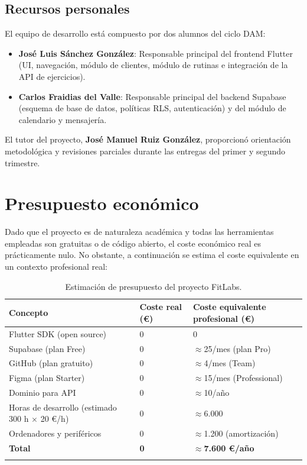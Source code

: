 \subsection{Recursos personales}

El equipo de desarrollo está compuesto por dos alumnos del ciclo DAM:

\begin{itemize}
  \item \textbf{José Luis Sánchez González}: Responsable principal del frontend Flutter (UI, navegación, módulo de clientes, módulo de rutinas e integración de la API de ejercicios).
  \item \textbf{Carlos Fraidias del Valle}: Responsable principal del backend Supabase (esquema de base de datos, políticas RLS, autenticación) y del módulo de calendario y mensajería.
\end{itemize}

El tutor del proyecto, \textbf{José Manuel Ruiz González}, proporcionó orientación metodológica y revisiones parciales durante las entregas del primer y segundo trimestre.

\section{Presupuesto económico}

Dado que el proyecto es de naturaleza académica y todas las herramientas empleadas son gratuitas o de código abierto, el coste económico real es prácticamente nulo. No obstante, a continuación se estima el coste equivalente en un contexto profesional real:

\begin{longtable}{@{}p{6.5cm}p{3cm}p{4cm}@{}}
\toprule
\textbf{Concepto} & \textbf{Coste real (€)} & \textbf{Coste equivalente profesional (€)} \\
\midrule
\endhead
Flutter SDK (open source) & 0 & 0 \\
Supabase (plan Free) & 0 & $\approx$25/mes (plan Pro) \\
GitHub (plan gratuito) & 0 & $\approx$4/mes (Team) \\
Figma (plan Starter) & 0 & $\approx$15/mes (Professional) \\
Dominio para API & 0 & $\approx$10/año \\
Horas de desarrollo (estimado 300 h $\times$ 20 €/h) & 0 & $\approx$6.000 \\
Ordenadores y periféricos & 0 & $\approx$1.200 (amortización) \\
\midrule
\textbf{Total} & \textbf{0} & \textbf{$\approx$7.600 €/año} \\
\bottomrule
\caption{Estimación de presupuesto del proyecto FitLabs.}
\label{tab:presupuesto}
\end{longtable}

